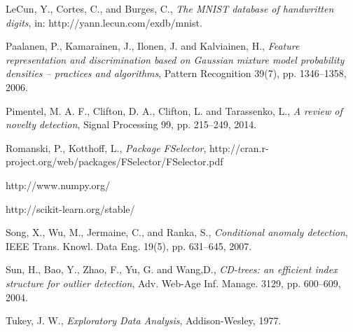 \documentclass{llncs}
\begin{document}
\begin{thebibliography}{1}
LeCun, Y., Cortes, C., and Burges, C., \emph{The MNIST database of handwritten digits}, in: http://yann.lecun.com/exdb/mnist.

Paalanen, P., Kamarainen, J., Ilonen, J. and Kalviainen, H., \emph{Feature representation
and discrimination based on Gaussian mixture model probability densities – practices and algorithms}, Pattern Recognition 39(7), pp. 1346--1358, 2006.

Pimentel, M. A. F., Clifton, D. A., Clifton, L. and Tarassenko, L., \emph{A review of novelty detection}, Signal Processing 99, pp. 215--249, 2014.

Romanski, P., Kotthoff, L., \emph{Package FSelector}, http://cran.r-project.org/web/packages/FSelector/FSelector.pdf

http://www.numpy.org/

http://scikit-learn.org/stable/

Song, X., Wu, M., Jermaine, C., and Ranka, S., \emph{Conditional anomaly detection}, IEEE Trans. Knowl. Data Eng. 19(5), pp. 631--645, 2007.

Sun, H., Bao, Y., Zhao, F., Yu, G. and Wang,D., \emph{CD-trees: an efficient index structure for outlier detection}, Adv. Web-Age Inf. Manage. 3129, pp. 600--609, 2004.

Tukey, J. W., \emph{Exploratory Data Analysis}, Addison-Wesley, 1977.
\end{thebibliography}
\end{document}
